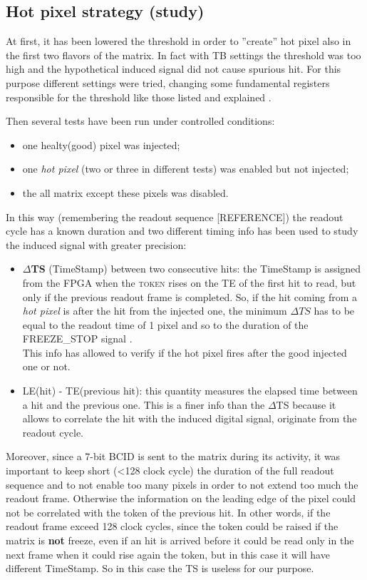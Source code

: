 \subsection{Hot pixel strategy (study)}

At first, it has been lowered the threshold in order to ''create'' hot pixel also in the first two flavors of the matrix. In fact with TB settings the threshold was too high and the hypothetical induced signal did not cause spurious hit. For this purpose different settings were tried, changing some fundamental registers responsible for the threshold like those listed and explained . 

Then several tests have been run under controlled conditions:
\begin{itemize}
\item one healty(good) pixel was injected;
\item one \textit{hot pixel} (two or three in different tests) was enabled but not injected;
\item the all matrix except these pixels was disabled.
\end{itemize}

In this way (remembering the readout sequence [REFERENCE]) the readout cycle has a known duration and two different timing info has been used to study the induced signal with greater precision:

\begin{itemize}
\item \textbf{$\Delta$TS} (TimeStamp) between two consecutive hits: the TimeStamp is assigned from the FPGA when the \textsc{token} rises on the TE of the first hit to read, but only if the previous readout frame is completed. So, if the hit coming from a \textit{hot pixel} is after the hit from the injected one, the minimum $\Delta TS$ has to be equal to the readout time of 1 pixel and so to the duration of the \textsc{FREEZE\_STOP} signal .\\
This info has allowed to verify if the hot pixel fires after the good injected one or not.
\item LE(hit) - TE(previous hit): this quantity measures the elapsed time between a hit and the previous one. This is a finer info than the $\Delta$TS because it allows to correlate the hit with the induced digital signal, originate from the readout cycle.
\end{itemize}

Moreover, since a 7-bit BCID is sent to the matrix during its activity, it was important to keep short (<128 clock cycle) the duration of the full readout sequence and to not enable too many pixels in order to not extend too much the readout frame. Otherwise the information on the leading edge of the pixel could not be correlated with the token of the previous hit. In other words, if the readout frame exceed 128 clock cycles, since the token could be raised if the matrix is \textbf{not} freeze, even if an hit is arrived before it could be read only in the next frame when it could rise again the token, but in this case it will have different TimeStamp. So in this case the TS is useless for our purpose.


